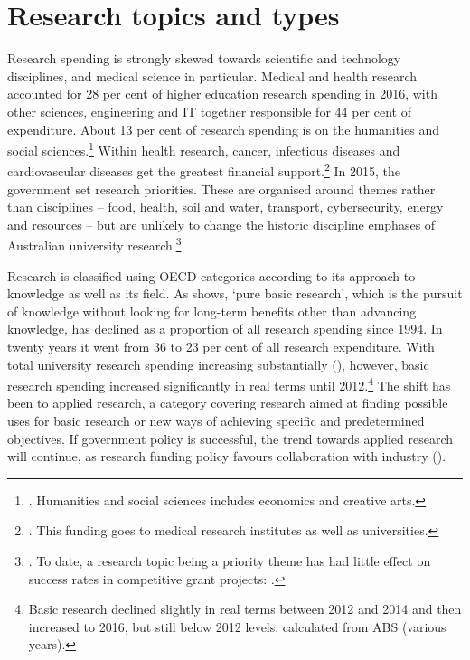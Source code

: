 \documentclass{grattan}
\begin{document}
%
\section{Research topics and types}\label{sec:research-topics-and-types}

Research spending is strongly skewed towards scientific and technology disciplines, and medical science in particular. Medical and health research accounted for 28 per cent of higher education research spending in 2016, with other sciences, engineering and IT together responsible for 44 per cent of expenditure. About 13 per cent of research spending is on the humanities and social sciences.\footnote{\textcite[][]{ABS2018researchandexperi}. Humanities and social sciences includes economics and creative arts.} Within health research, cancer, infectious diseases and cardiovascular diseases get the greatest financial support.\footnote{\textcite[][]{NHMRC2018researchfundingst}. This funding goes to medical research institutes as well as universities.} In 2015, the government set research priorities. These are organised around themes rather than disciplines -- food, health, soil and water, transport, cybersecurity, energy and resources -- but are unlikely to change the historic discipline emphases of Australian university research.\footnote{\textcite[][]{AustralianGovernment2015scienceandresearc}. To date, a research topic being a priority theme has had little effect on success rates in competitive grant projects: \textcites[][]{ARC2018selectionreportl}[][]{ARC2018selectionreportd}.}

Research is classified using OECD categories according to its approach to knowledge as well as its field. As  shows, `pure basic research', which is the pursuit of knowledge without looking for long-term benefits other than advancing knowledge, has declined as a proportion of all research spending since 1994. In twenty years it went from 36 to 23 per cent of all research expenditure. With total university research spending increasing substantially (), however, basic research spending increased significantly in real terms until 2012.\footnote{Basic research declined slightly in real terms between 2012 and 2014 and then increased to 2016, but still below 2012 levels: calculated from ABS (various years).} The shift has been to applied research, a category covering research aimed at finding possible uses for basic research or new ways of achieving specific and predetermined objectives. If government policy is successful, the trend towards applied research will continue, as research funding policy favours collaboration with industry ().
\end{document}

